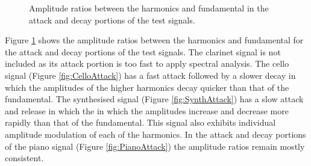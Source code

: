 \begin{figure}[h!]
			\caption{Amplitude ratios between the harmonics and fundamental in the attack and decay
				 portions of the test signals.}
			\label{fig:AttackAmplitudes}
		\end{figure}

		Figure \ref{fig:AttackAmplitudes} shows the amplitude ratios between the harmonics and fundamental for the
		attack and decay portions of the test signals. The clarinet signal is not included as its attack portion is
		too fast to apply spectral analysis. The cello signal (Figure \ref{fig:CelloAttack}) has a fast attack
		followed by a slower decay in which the amplitudes of the higher harmonics decay quicker than that of the
		fundamental. The synthesised signal (Figure \ref{fig:SynthAttack}) has a slow attack and release in which
		the in which the amplitudes increase and decrease more rapidly than that of the fundamental. This signal
		also exhibits individual amplitude modulation of each of the harmonics. In the attack and decay portions of
		the piano signal (Figure \ref{fig:PianoAttack}) the amplitude ratios remain mostly consistent.

